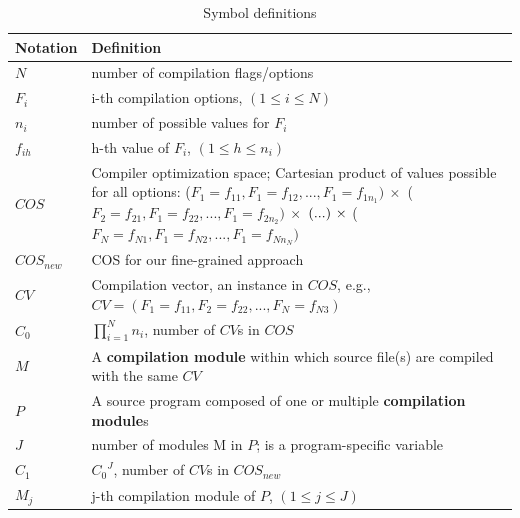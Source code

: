 \begin {table}[t]
\caption{Symbol definitions}
\label{table:notations}
\centering
\footnotesize
\begin{tabular}{ p{2cm}p{14cm} }
\hline
\textbf{Notation} &  \textbf{Definition} \\ \hline
$N$ & number of compilation flags/options\\ \hline
$F_i$ & i-th compilation options, $(1\leq{i}\leq{N})$\\ 
\hline
$n_i$  & number of possible values for $F_i$ \\ \hline
$f_{ih}$  & h-th value of $F_i$, $(1\leq{h}\leq{n_i})$ \\ 
\hline
$COS$ & Compiler optimization space; Cartesian
   product of values possible for all options:
   ($F_1=f_{11}, F_1=f_{12}, ..., F_1=f_{1n_1})~\times$
    ($F_2=f_{21}, F_1=f_{22}, ..., F_1=f_{2n_2})~\times$
   $\space(...)~\times$ ($F_N=f_{N1}, F_1=f_{N2}, ..., F_1=f_{Nn_N})$\\ \hline
$COS_{new}$& COS for our fine-grained approach\\ \hline
$CV$ & Compilation vector, an instance in $COS$, e.g.,
  $CV=(F_1=f_{11}, F_2=f_{22}, ..., F_N=f_{N3})$\\ \hline
 $C_0$ & $\prod_{i=1}^{N} n_{i}$, number of $CV$s in $COS$ \\ \hline
$M$ & A \textbf{compilation module} within which source file(s) are compiled with the same $CV$ \\ \hline
 $P$  & A source program composed of one or multiple \textbf{compilation module}s\\ \hline
 $J$ & number of modules M in $P$; is a program-specific variable \\ \hline
 $C_1$ & ${C_0}^J$, number of $CV$s in $COS_{new}$ \\ \hline
 $M_j$ & j-th compilation module of $P$, $(1\leq{j}\leq{J})$\\

\end{tabular}
\end{table}
